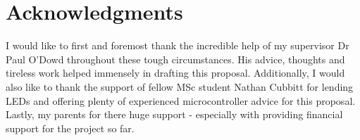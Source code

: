 \documentclass{sigchi}
\begin{document}
\newpage


\section{Acknowledgments}

I would like to first and foremost thank the incredible help of my supervisor Dr Paul O'Dowd throughout these tough circumstances. His advice, thoughts and tireless work helped immensely in drafting this proposal. Additionally, I would also like to thank the support of fellow MSc student Nathan Cubbitt for lending LEDs and offering plenty of experienced microcontroller advice for this proposal. Lastly, my parents for there huge support - especially with providing financial support for the project so far. 

\balance{}



\end{document}
